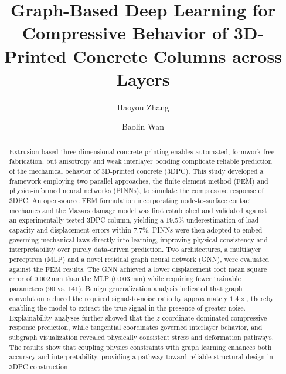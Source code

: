 \documentclass[review, authoryear, 12pt]{elsarticle}
\begin{document}
\begin{frontmatter}

\title{Graph-Based Deep Learning for Compressive Behavior of 3D-Printed Concrete Columns across Layers} %

\author[mu]{Haoyou Zhang} %
\author[mu]{Baolin Wan} %


\begin{abstract}
Extrusion-based three-dimensional concrete printing enables automated, formwork-free fabrication, but anisotropy and weak interlayer bonding complicate reliable prediction of the mechanical behavior of 3D-printed concrete (3DPC). This study developed a framework employing two parallel approaches, the finite element method (FEM) and physics-informed neural networks (PINNs), to simulate the compressive response of 3DPC. An open-source FEM formulation incorporating node-to-surface contact mechanics and the Mazars damage model was first established and validated against an experimentally tested 3DPC column, yielding a 19.5\% underestimation of load capacity and displacement errors within 7.7\%. PINNs were then adopted to embed governing mechanical laws directly into learning, improving physical consistency and interpretability over purely data-driven prediction. Two architectures, a multilayer perceptron (MLP) and a novel residual graph neural network (GNN), were evaluated against the FEM results. The GNN achieved a lower displacement root mean square error of $0.002\,\text{mm}$ than the MLP ($0.003\,\text{mm}$) while requiring fewer trainable parameters (90 vs. 141). Benign generalization analysis indicated that graph convolution reduced the required signal-to-noise ratio by approximately $1.4\times$, thereby enabling the model to extract the true signal in the presence of greater noise. Explainability analyses further showed that the $z$-coordinate dominated compressive-response prediction, while tangential coordinates governed interlayer behavior, and subgraph visualization revealed physically consistent stress and deformation pathways. The results show that coupling physics constraints with graph learning enhances both accuracy and interpretability, providing a pathway toward reliable structural design in 3DPC construction.


\end{abstract}
\end{frontmatter}
\end{document}

